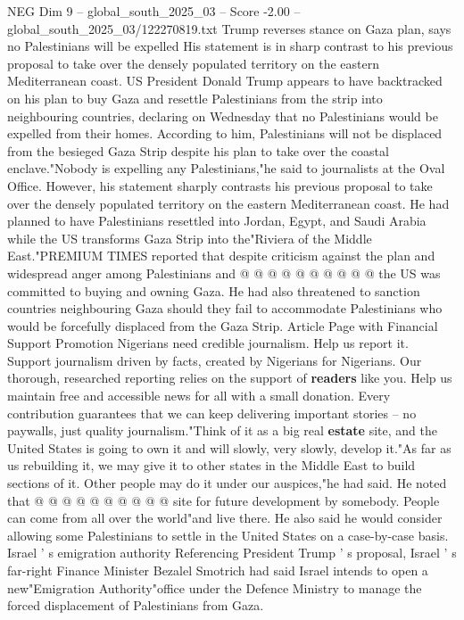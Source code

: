 \begin{textsample}{NEG Dim 9 – global\_south\_2025\_03 – Score -2.00 – global\_south\_2025\_03/122270819.txt}  \label{ex:f9_neg_320}
Trump reverses stance on Gaza plan, says no Palestinians will be expelled His statement is in sharp contrast to his previous proposal to take over the densely populated territory on the eastern Mediterranean coast.
US President Donald Trump appears to have backtracked on his plan to buy Gaza and resettle Palestinians from the strip into neighbouring countries, declaring on Wednesday that no Palestinians would be expelled from their homes.
According to him, Palestinians will not be displaced from the besieged Gaza Strip despite his plan to take over the coastal enclave."Nobody is expelling any Palestinians,"he said to journalists at the Oval Office.
However, his statement sharply contrasts his previous proposal to take over the densely populated territory on the eastern Mediterranean coast.
He had planned to have Palestinians resettled into Jordan, Egypt, and Saudi Arabia while the US transforms Gaza Strip into the"Riviera of the Middle East."PREMIUM TIMES reported that despite criticism against the plan and widespread anger among Palestinians and @ @ @ @ @ @ @ @ @ @ the US was committed to buying and owning Gaza.
He had also threatened to sanction countries neighbouring Gaza should they fail to accommodate Palestinians who would be forcefully displaced from the Gaza Strip.
Article Page with Financial Support Promotion Nigerians need credible journalism.
Help us report it.
Support journalism driven by facts, created by Nigerians for Nigerians.
Our thorough, researched reporting relies on the support of \textbf{readers} like you.
Help us maintain free and accessible news for all with a small donation.
Every contribution guarantees that we can keep delivering important stories -- no paywalls, just quality journalism."Think of it as a big real \textbf{estate} site, and the United States is going to own it and will slowly, very slowly, develop it."As far as us rebuilding it, we may give it to other states in the Middle East to build sections of it.
Other people may do it under our auspices,"he had said.
He noted that @ @ @ @ @ @ @ @ @ @ site for future development by somebody.
People can come from all over the world"and live there.
He also said he would consider allowing some Palestinians to settle in the United States on a case-by-case basis.
Israel ' s emigration authority Referencing President Trump ' s proposal, Israel ' s far-right Finance Minister Bezalel Smotrich had said Israel intends to open a new"Emigration Authority"office under the Defence Ministry to manage the forced displacement of Palestinians from Gaza.

\end{textsample}
